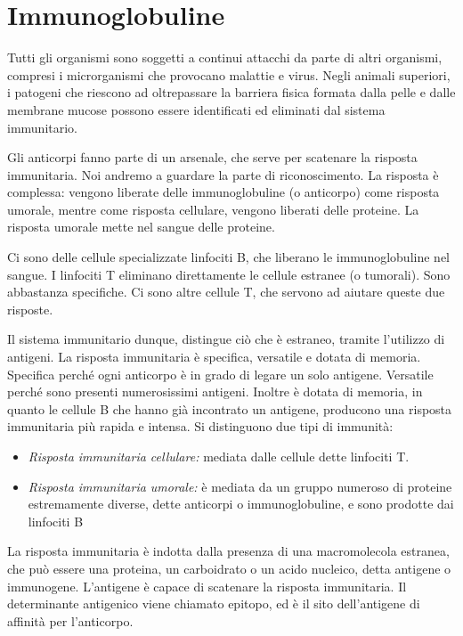 \chapter{Immunoglobuline}


Tutti gli organismi sono soggetti a continui attacchi da parte di altri organismi, compresi i microrganismi che provocano malattie e virus. Negli animali superiori, i patogeni che riescono ad oltrepassare la barriera fisica formata dalla pelle e dalle membrane mucose possono essere identificati ed eliminati dal sistema immunitario.

Gli anticorpi fanno parte di un arsenale, che serve per scatenare la
risposta immunitaria. Noi andremo a guardare la parte di riconoscimento.
La risposta è complessa: vengono liberate delle immunoglobuline (o
anticorpo) come risposta umorale, mentre come risposta cellulare,
vengono liberati delle proteine.
La risposta umorale mette nel sangue delle proteine.

Ci sono delle cellule specializzate linfociti B, che liberano le
immunoglobuline nel sangue. I linfociti T eliminano direttamente le
cellule estranee (o tumorali). Sono abbastanza specifiche.
Ci sono altre cellule T, che servono ad aiutare queste due risposte.

Il sistema immunitario dunque, distingue ciò che è estraneo, tramite l'utilizzo di antigeni. La risposta immunitaria è specifica, versatile e dotata di memoria. Specifica perché ogni anticorpo è in grado di legare un solo antigene. Versatile perché sono presenti numerosissimi antigeni. Inoltre è dotata di memoria, in quanto le cellule B che hanno già incontrato un antigene, producono una risposta immunitaria più rapida e intensa. Si distinguono due tipi di immunità:
\begin{itemize}
\item \emph{Risposta immunitaria cellulare:} mediata dalle cellule dette linfociti T.
\item \emph{Risposta immunitaria umorale:} è mediata da un gruppo numeroso di proteine estremamente diverse, dette anticorpi o immunoglobuline, e sono prodotte dai linfociti B
\end{itemize}

La risposta immunitaria è indotta dalla presenza di una macromolecola estranea, che può essere una proteina, un carboidrato o un acido nucleico, detta antigene o immunogene. L'antigene è capace di scatenare la risposta immunitaria. Il determinante antigenico viene chiamato epitopo, ed è il sito dell'antigene di affinità per l'anticorpo.

